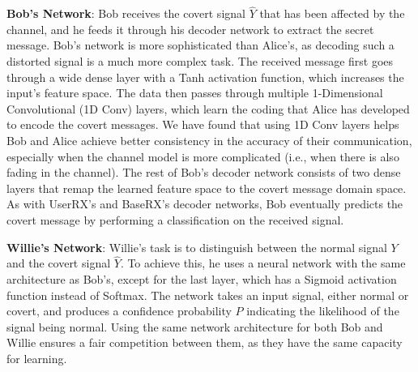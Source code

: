 \textbf{Bob's Network}: Bob receives the covert signal \(\hat{Y}\) that has been affected by the channel, and he feeds it through his decoder network to extract the secret message. Bob's network is more sophisticated than Alice's, as decoding such a distorted signal is a much more complex task. The received message first goes through a wide dense layer with a Tanh activation function, which increases the input's feature space. The data then passes through multiple 1-Dimensional Convolutional (1D Conv) layers, which learn the coding that Alice has developed to encode the covert messages. We have found that using 1D Conv layers helps Bob and Alice achieve better consistency in the accuracy of their communication, especially when the channel model is more complicated (i.e., when there is also fading in the channel). The rest of Bob's decoder network consists of two dense layers that remap the learned feature space to the covert message domain space. As with UserRX's and BaseRX's decoder networks, Bob eventually predicts the covert message by performing a classification on the received signal.

\textbf{Willie's Network}: Willie's task is to distinguish between the normal signal  \(Y\) and the covert  signal \(\hat{Y}\). To achieve this, he uses a neural network with the same architecture as Bob's, except for the last layer, which has a Sigmoid activation function instead of Softmax. The network takes an input signal, either normal or covert, and produces a confidence probability \(P\) indicating the likelihood of the signal being normal. Using the same network architecture for both Bob and Willie ensures a fair competition between them, as they have the same capacity for learning.

